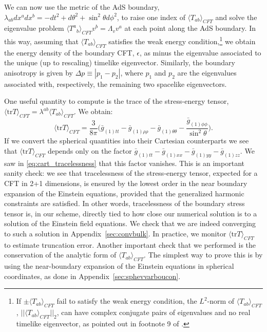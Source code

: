 \documentclass[aps,letterpaper,twocolumn,nofootinbib]{revtex4}
\numberwithin{equation}{section}
\begin{document}
We can now use the metric of the AdS boundary, $\lambda_{ab}dx^a dx^b=-dt^2+d\theta^2+\sin^2\theta d\phi^2$, to raise one index of $\langle T_{ab}\rangle_{CFT}$ and solve the eigenvalue problem $\langle {T^a}_{b}\rangle_{CFT} v^b=\Lambda_v v^a$ at each point along the AdS boundary. In this way, assuming that $\langle T_{ab}\rangle_{CFT}$ satisfies the weak energy condition,\footnote{If $\pm \langle T_{ab}\rangle_{CFT}$ fail to satisfy the weak energy condition, the $L^2$-norm of $\langle T_{ab}\rangle_{CFT}$, $||\langle T_{ab}\rangle_{CFT}||_2$, can have complex conjugate pairs of eigenvalues and no real timelike eigenvector, as pointed out in footnote 9 of \cite{Chesler:2013lia}.} we obtain the energy density of the boundary CFT, $\epsilon$, as minus the eigenvalue associated to the unique (up to rescaling) timelike eigenvector. Similarly, the boundary anisotropy is given by $\Delta p\equiv|p_1-p_2|$, where $p_1$ and $p_2$ are the eigenvalues associated with, respectively, the remaining two spacelike eigenvectors.

One useful quantity to compute is the trace of the stress-energy tensor, $\langle \text{tr}T\rangle_{CFT}=\lambda^{ab} \langle T_{ab}\rangle_{CFT}$. We obtain:
\begin{equation}
\label{eq:tracecalc}
\langle \text{tr}T\rangle_{CFT}=\frac{3}{8\pi}\biggl(\bar{g}_{(1)tt}-\bar{g}_{(1)\rho\rho}-\bar{g}_{(1)\theta\theta}-\frac{\bar{g}_{(1)\phi\phi}}{\sin^2\theta}\biggr).
\end{equation}
If we convert the spherical quantities into their Cartesian counterparts 
we see that $\langle \text{tr}T\rangle_{CFT}$ depends only on the factor $\bar{g}_{(1)tt}-\bar{g}_{(1)xx}-\bar{g}_{(1)yy}-\bar{g}_{(1)zz}$. 
We saw in \eqref{eq:cart_tracelessness} that this factor vanishes.
This is an important sanity check: we see that tracelessness of the stress-energy tensor, expected for a CFT in 2+1 dimensions, is ensured by the lowest order in the near boundary expansion of the Einstein equations, provided that the generalized harmonic constraints are satisfied.
In other words, tracelessness of the boundary stress tensor is, in our scheme, directly tied to how close our numerical solution is to a solution of the Einstein field equations. 
We check that we are indeed converging to such a solution in Appendix~\ref{sec:convbulk}.
In practice, we monitor $\langle \text{tr}T\rangle_{CFT}$ to estimate truncation error.
Another important check that we performed is the conservation of the analytic form of $\langle T_{ab}\rangle_{CFT}$. 
The simplest way to prove this is by using the near-boundary expansion of the Einstein equations in spherical coordinates, as done in Appendix~\ref{sec:sphevvarboucon}.
\end{document}
